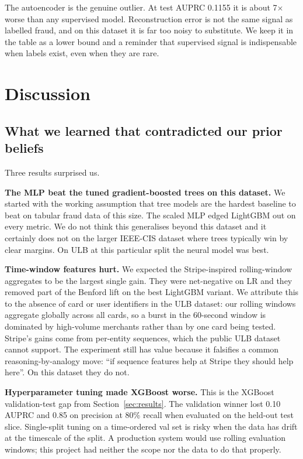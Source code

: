 \documentclass{article}
\begin{document}
The autoencoder is the genuine outlier. At test AUPRC 0.1155 it is about 7$\times$ worse than any supervised model. Reconstruction error is not the same signal as labelled fraud, and on this dataset it is far too noisy to substitute. We keep it in the table as a lower bound and a reminder that supervised signal is indispensable when labels exist, even when they are rare.

\section{Discussion}
\label{sec:discussion}

\subsection{What we learned that contradicted our prior beliefs}

Three results surprised us.

\textbf{The MLP beat the tuned gradient-boosted trees on this dataset.} We started with the working assumption that tree models are the hardest baseline to beat on tabular fraud data of this size. The scaled MLP edged LightGBM out on every metric. We do not think this generalises beyond this dataset and it certainly does not on the larger IEEE-CIS dataset where trees typically win by clear margins. On ULB at this particular split the neural model was best.

\textbf{Time-window features hurt.} We expected the Stripe-inspired rolling-window aggregates to be the largest single gain. They were net-negative on LR and they removed part of the Benford lift on the best LightGBM variant. We attribute this to the absence of card or user identifiers in the ULB dataset: our rolling windows aggregate globally across all cards, so a burst in the 60-second window is dominated by high-volume merchants rather than by one card being tested. Stripe's gains come from per-entity sequences, which the public ULB dataset cannot support. The experiment still has value because it falsifies a common reasoning-by-analogy move: ``if sequence features help at Stripe they should help here''. On this dataset they do not.

\textbf{Hyperparameter tuning made XGBoost worse.} This is the XGBoost validation-test gap from Section~\ref{sec:results}. The validation winner lost 0.10 AUPRC and 0.85 on precision at 80\% recall when evaluated on the held-out test slice. Single-split tuning on a time-ordered val set is risky when the data has drift at the timescale of the split. A production system would use rolling evaluation windows; this project had neither the scope nor the data to do that properly.
\end{document}
